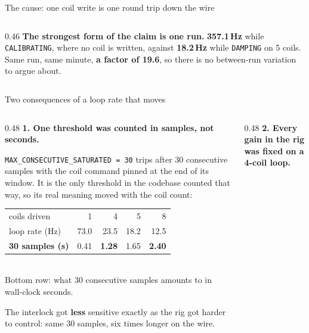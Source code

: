 \documentclass[aspectratio=169]{beamer}
\begin{document}
\begin{frame}{The cause: one coil write is one round trip down the wire}
\begin{columns}[T]
\begin{column}{0.46\textwidth}
      \vspace{1.5mm}
      \alert{\textbf{The strongest form of the claim is one run.}}
      \textbf{357.1\,Hz} while \texttt{CALIBRATING}, where no coil is written,
      against \textbf{18.2\,Hz} while \texttt{DAMPING} on 5 coils. Same run, same
      minute, \textbf{a factor of 19.6}, so there is no between-run variation to
      argue about.
    \end{column}
  \end{columns}
\end{frame}

\begin{frame}{Two consequences of a loop rate that moves}
  \footnotesize
  \begin{columns}[T]
    \begin{column}{0.48\textwidth}
      \textbf{1. One threshold was counted in samples, not seconds.}

      \vspace{1mm}
      \texttt{MAX\_CONSECUTIVE\_SATURATED = 30} trips after 30 consecutive
      samples with the coil command pinned at the end of its window. It is the
      only threshold in the codebase counted that way, so its real meaning moved
      with the coil count:

      \vspace{1.5mm}
      \centering
      {\scriptsize
      \begin{tabular}{@{}lrrrr@{}}
        \toprule
        coils driven & 1 & 4 & 5 & 8 \\
        loop rate (Hz) & 73.0 & 23.5 & 18.2 & 12.5 \\
        \midrule
        \textbf{30 samples (s)} & 0.41 & \textbf{1.28} & 1.65 & \textbf{2.40} \\
        \bottomrule
      \end{tabular}}\\[1mm]
      {\scriptsize Bottom row: what 30 consecutive samples amounts to in
      wall-clock seconds.}

      \vspace{1.5mm}
      \raggedright
      \alert{The interlock got \textbf{less} sensitive exactly as the rig got
      harder to control:} same 30 samples, six times longer on the wire.
    \end{column}
    \begin{column}{0.48\textwidth}
      \textbf{2. Every gain in the rig was fixed on a 4-coil loop.}


\end{column}
\end{columns}
\end{frame}
\end{document}
